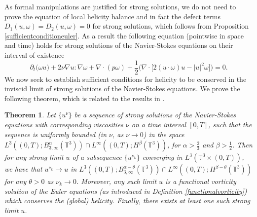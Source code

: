 \documentclass[12pt,a4paper]{article}
\newtheorem{theorem}{Theorem}[section]
\theoremstyle{definition}
\theoremstyle{remark}
\numberwithin{equation}{section}
\begin{document}
As formal manipulations are justified for strong solutions, we do not need to prove the equation of local helicity balance and in fact the defect terms $D_1 (u, \omega) = D_2 (u, \omega) = 0$ for strong solutions, which follows from Proposition \ref{sufficientconditioneuler}. As a result the following equation (pointwise in space and time) holds for strong solutions of the Navier-Stokes equations on their interval of existence
\begin{equation}
\partial_t \big( \omega u \big) + 2 \nu \nabla u : \nabla \omega + \nabla \cdot (p \omega) + \frac{1}{2} \bigg( \nabla \cdot \big[ 2 (u \cdot \omega) u - \lvert u \rvert^2 \omega \big] \bigg) = 0.
\end{equation}
We now seek to establish sufficient conditions for helicity to be conserved in the inviscid limit of strong solutions of the Navier-Stokes equations. We prove the following theorem, which is related to the results in \cite{drivaseyink}.
\begin{theorem}
Let $\{ u^\nu \}$ be a sequence of strong solutions of the Navier-Stokes equations with corresponding viscosities $\nu$ on a time interval $[0,T]$, such that the sequence is uniformly bounded (in $\nu$, as $\nu \rightarrow 0$) in the space $L^3 ((0,T);B^{\alpha}_{3,\infty} (\mathbb{T}^3)) \cap L^\infty ((0,T); H^{\beta} (\mathbb{T}^3))$, for $\alpha > \frac{2}{3}$ and $\beta > \frac{1}{2}$. Then for any strong limit $u$ of a subsequence $\{ u^{\nu_k} \}$ converging in $L^3 (\mathbb{T}^3 \times (0,T))$, we have that $u^{\nu_k} \rightarrow u$ in $L^3 ((0,T);B^{\alpha-\theta}_{3,\infty} (\mathbb{T}^3)) \cap L^\infty ((0,T); H^{\beta - \theta} (\mathbb{T}^3))$ for any $\theta > 0$ as $\nu_k \rightarrow 0$. Moreover, any such limit $u$ is a functional vorticity solution of the Euler equations (as introduced in Definition \ref{functionalvorticity}) which conserves the (global) helicity. Finally, there exists at least one such strong limit $u$.
\end{theorem}
\end{document}
